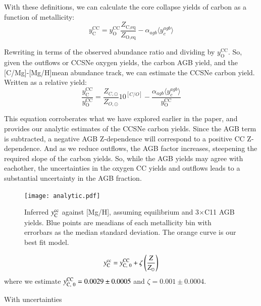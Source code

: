 \documentclass[12pt,oneside]{report}
\newcommand{\caah}{[C/Mg]-[Mg/H]}
\newcommand{\Ycc}{\ensuremath{y_{\rm C}^{\rm cc}}}
\newcommand{\sun}{\ensuremath{\odot}}
\begin{document}
With these definitions, we can calculate the core collapse yields of carbon as a function of metallicity:
\begin{equation}
    y_\text{C}^\text{CC} =  y_\text{O}^\text{CC} \frac{Z_\text{C,eq}}{Z_\text{O,eq}} - \alpha_{agb} \langle y_c^{agb} \rangle
\end{equation}

Rewriting in terms of the observed abundance ratio and dividing by
$y_\text{O}^\text{CC}$. So, given the outflows or CCSNe oxygen yields, the
carbon AGB yield, and the \caah mean abundance track, we can estimate the CCSNe carbon yield. Written as a relative yield:
\begin{equation}
    \frac{y_\text{C}^\text{CC}}{y_\text{O}^\text{CC}} = \frac{Z_{C, \sun}}{Z_{O, \sun}} 10^{[C/O]} - \frac{\alpha_{agb} \langle y_c^{agb} \rangle}{ y_\text{O}^\text{CC}}
\end{equation}

This equation corroberates what we have explored earlier in the paper, and provides our analytic estimates of the CCSNe carbon yields. Since the AGB term is subtracted, a negative AGB Z-dependence will correspond to a positive CC Z-dependence. And as we reduce outflows, the AGB factor increases, steepening the required slope of the carbon yields. So, while the AGB yields may agree with eachother, the uncertainties in the oxygen CC yields and outflows leads to a substantial uncertainty in the AGB fraction.  

\begin{figure}
    \centering
    \texttt{[image: analytic.pdf]}
    \caption[Reverse fit yields]{Inferred $\Ycc$ against [Mg/H], assuming equilibrium and 3$\times$C11 AGB yields. Blue points are meadians of each metallicity bin with errorbars as the median standard deviation. The orange curve is our best fit model.}
\end{figure}

\begin{equation}
    \Ycc = y_{\rm C,~0}^{\rm CC} + \zeta \left(\frac{Z}{Z_\odot}\right)
\end{equation}
where we estimate $y_{\rm C,~0}^{\rm CC} = 0.0029\pm 0.0005$ and $\zeta = 0.001\pm0.0004$.

With uncertainties 
\end{document}
